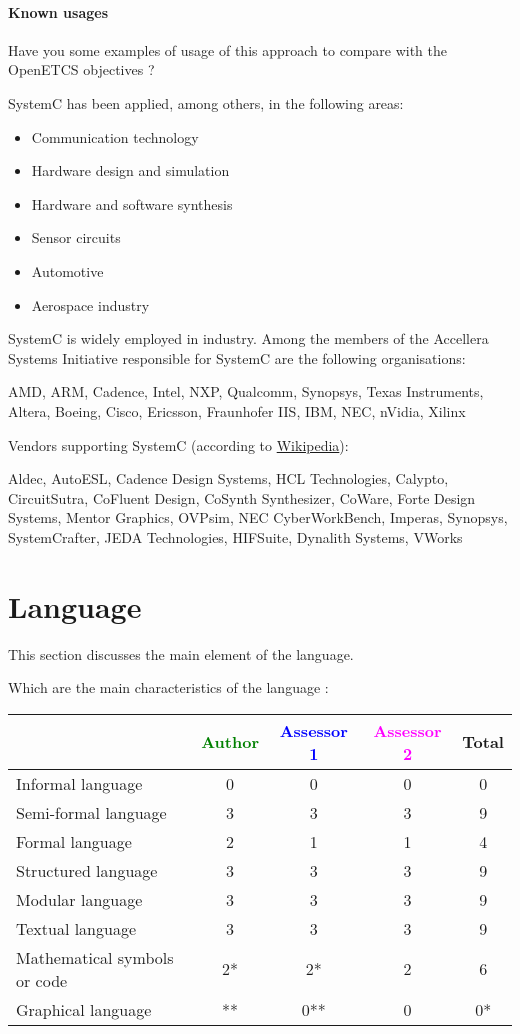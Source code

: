 \paragraph{Known usages} Have you some examples of usage of this approach to compare with the OpenETCS objectives ?

SystemC has been applied, among others, in the following areas:

\begin{itemize}
\item Communication technology
\item Hardware design and simulation
\item Hardware and software synthesis
\item Sensor circuits
\item Automotive
\item Aerospace industry
\end{itemize}

SystemC is widely employed in industry. Among the members of the Accellera Systems Initiative responsible for SystemC are the following organisations:

AMD, ARM, Cadence, Intel, NXP, Qualcomm, Synopsys, Texas Instruments, Altera, Boeing, Cisco, Ericsson, Fraunhofer IIS, IBM, NEC, nVidia, Xilinx

Vendors supporting SystemC (according to \href{http://en.wikipedia.org/wiki/SystemC}{Wikipedia}):

Aldec, AutoESL, Cadence Design Systems, HCL Technologies, Calypto, CircuitSutra, CoFluent Design, CoSynth Synthesizer, CoWare, Forte Design Systems, Mentor Graphics, OVPsim, NEC CyberWorkBench, Imperas, Synopsys, SystemCrafter, JEDA Technologies, HIFSuite, Dynalith Systems, VWorks


\section{Language}
This section discusses the main element of the language.

Which are the main characteristics of the language :

\begin{tabular}{|l | c | c | c | c|}
\hline
& \textcolor{green}{Author} & \textcolor{blue}{Assessor 1} & \textcolor{magenta}{Assessor 2} & Total \\
\hline
Informal language &0 & 0 & 0 & 0 \\
\hline
Semi-formal language &3 & 3& 3 & 9 \\
\hline
Formal language &2 &1 & 1 & 4 \\
\hline
Structured language &3 &3 & 3 & 9 \\
\hline
Modular language &3 &3 & 3 & 9  \\
\hline
Textual language &3 &3 & 3 & 9 \\
\hline
Mathematical symbols or code &2* &2* & 2 & 6 \\
\hline
Graphical language &** & 0**& 0 &  0* \\
\hline
\end{tabular}


